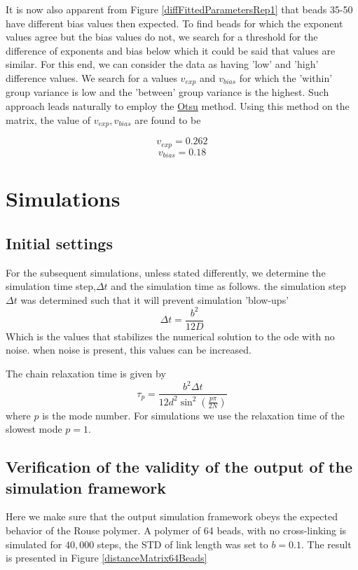 \documentclass[12pt]{paper}
\begin{document}
It is now also apparent from Figure \ref{diffFittedParametersRep1} that beads 35-50 have different bias values then expected. To find beads for which the exponent values agree but the bias values do not, we search for a threshold for the difference of exponents and bias below which it could be said that values are similar. 
For this end, we can consider the data as having 'low' and 'high' difference values. 
We search for a values $v_{exp}$ and $v_{bias}$ for which the 'within' group variance is low and the 'between' group variance is the highest. 
Such approach leads naturally to employ the \href{http://en.wikipedia.org/wiki/Otsu's_method}{Otsu} method. Using this method on the matrix, the value of $v_{exp},v_{bias}$ are found to be 

\begin{equation}
v_{exp}= 0.262
\end{equation}
\begin{equation}
v_{bias}=0.18
\end{equation}

\section{Simulations}
\subsection{Initial settings}
For the subsequent simulations, unless stated differently, we determine the simulation time step,$\Delta t$ and the simulation time as follows. 
the simulation step $\Delta t$  was determined such that it will prevent simulation 'blow-ups'
\begin{equation*}
 \Delta t = \frac{b^2}{12D}
\end{equation*}
Which is the values that stabilizes the numerical solution to the ode with no noise. when noise is present, this values can be increased.

The chain relaxation time is given by 
\begin{equation*}
\tau_p = \frac{b^2\Delta t}{12d^2\sin^2(\frac{p\pi}{2N})}
\end{equation*}
where $p$ is the mode number. For simulations we use the relaxation time of the slowest mode $p=1$.

\subsection{Verification of the validity of the output of the simulation framework}
Here we make sure that the output simulation framework obeys the expected behavior of the Rouse polymer. 
A polymer of 64 beads, with no cross-linking is simulated for $40,000$ steps, the STD of link length was set to $b=0.1$. The result is presented in Figure \ref{distanceMatrix64Beads}
\end{document}
